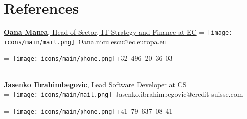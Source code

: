 \documentclass[]{plushcv}
\begin{document}
\begin{minipage}[t]{0.25\textwidth}

\section{References} 
\href{https://www.linkedin.com/in/oana-manea-05a7b57/}{\textbf{Oana Manea}, Head of Sector, IT Strategy and Finance at EC}
\begingroup
{}=\hbox{
\texttt{[image: icons/main/mail.png]}\hspace{0.3cm} Oana.niculescu@ec.europa.eu
}
\parbox{\wd0}{}
\endgroup
\begingroup
{}=\hbox{
\texttt{[image: icons/main/phone.png]}\hspace{0.3cm}+32 496 20 36 03
}
\parbox{\wd0}{}\endgroup
\\
\sectionsep
\href{https://www.linkedin.com/in/jasenko-ibrahimbegovic-391b80/}{\textbf{Jasenko Ibrahimbegovic}}, Lead Software Developer at CS
\\
\begingroup
{}=\hbox{
\texttt{[image: icons/main/mail.png]}\hspace{0.3cm} Jasenko.ibrahimbegovic@credit-suisse.com
}
\parbox{\wd0}{}
\endgroup
\begingroup
{}=\hbox{
\texttt{[image: icons/main/phone.png]}\hspace{0.3cm}+41 79 637 08 41
}
\parbox{\wd0}{}\endgroup
\\






\end{minipage} 
\end{document}
